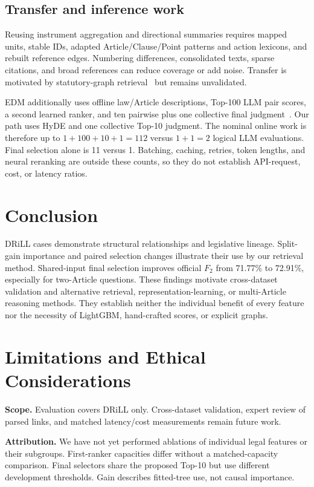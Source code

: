 \documentclass[runningheads,a4paper]{llncs}
\begin{document}
\FloatBarrier
\newpage

\FloatBarrier

\subsection{Transfer and inference work}
Reusing instrument aggregation and directional summaries requires mapped units, stable IDs, adapted Article/Clause/Point patterns and action lexicons, and rebuilt reference edges. Numbering differences, consolidated texts, sparse citations, and broad references can reduce coverage or add noise. Transfer is motivated by statutory-graph retrieval~\cite{louis2023finding} but remains unvalidated.

EDM additionally uses offline law/Article descriptions, Top-100 LLM pair scores, a second learned ranker, and ten pairwise plus one collective final judgment~\cite{pham2025edm}. Our path uses HyDE and one collective Top-10 judgment. The nominal online work is therefore up to $1+100+10+1=112$ versus $1+1=2$ logical LLM evaluations. Final selection alone is 11 versus 1. Batching, caching, retries, token lengths, and neural reranking are outside these counts, so they do not establish API-request, cost, or latency ratios.

\section{Conclusion}
DRiLL cases demonstrate structural relationships and legislative lineage. Split-gain importance and paired selection changes illustrate their use by our retrieval method. Shared-input final selection improves official $F_2$ from 71.77\% to 72.91\%, especially for two-Article questions. These findings motivate cross-dataset validation and alternative retrieval, representation-learning, or multi-Article reasoning methods. They establish neither the individual benefit of every feature nor the necessity of LightGBM, hand-crafted scores, or explicit graphs.

\section*{Limitations and Ethical Considerations}
\noindent\textbf{Scope.} Evaluation covers DRiLL only. Cross-dataset validation, expert review of parsed links, and matched latency/cost measurements remain future work.

\noindent\textbf{Attribution.} We have not yet performed ablations of individual legal features or their subgroups. First-ranker capacities differ without a matched-capacity comparison. Final selectors share the proposed Top-10 but use different development thresholds. Gain describes fitted-tree use, not causal importance.
\end{document}
